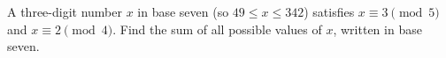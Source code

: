 A three-digit number $x$ in base seven (so $49\le x\le342$) satisfies $x\equiv3\pmod5$ and $x\equiv2\pmod4$. Find the sum of all possible values of $x$, written in base seven.
